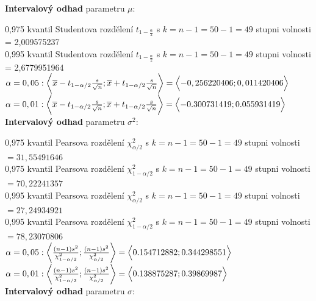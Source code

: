 \documentclass[11pt,a4paper]{article}
\begin{document}
\textbf{Intervalový odhad} parametru \textbf{$\mu:$}

0,975 kvantil Studentova rozdělení $ t_{1-\frac{\alpha}{2}} $ s $ k = n - 1 = 50 - 1 = 49 $ stupni volnosti = 2,009575237 \\

0,995 kvantil Studentova rozdělení $ t_{1-\frac{\alpha}{2}} $ s $ k = n - 1 = 50 - 1 = 49 $ stupni volnosti = 2,6779951964 \\

$ \alpha = 0,05 : \biggl< \overline{x} - t_{1-\alpha/2} \frac{s}{\sqrt{n}} ; \overline{x} + t_{1-\alpha/2} \frac{s}{\sqrt{n}} \biggr> = \Bigl< -0,256220406; 0,011420406 \Bigr>$ \\

$ \alpha = 0,01 : \biggl< \overline{x} - t_{1-\alpha/2} \frac{s}{\sqrt{n}} ; \overline{x} + t_{1-\alpha/2} \frac{s}{\sqrt{n}} \biggr> = \Bigl< -0.300731419; 0.055931419 \Bigr>$ \\

\vspace{0,7cm}
\textbf{Intervalový odhad} parametru \textbf{$\sigma^2:$}

0,975 kvantil Pearsova rozdělení $ \chi_{\alpha/2}^2 $ s $ k = n - 1 = 50 - 1 = 49 $ stupni volnosti $ = 31,55491646 $ \\

0,975 kvantil Pearsova rozdělení $ \chi_{1-\alpha/2}^2 $ s $ k = n - 1 = 50 - 1 = 49 $ stupni volnosti $ = 70,22241357 $ \\

0,995 kvantil Pearsova rozdělení $ \chi_{\alpha/2}^2 $ s $ k = n - 1 = 50 - 1 = 49 $ stupni volnosti $ = 27,24934921 $ \\

0,995 kvantil Pearsova rozdělení $ \chi_{1-\alpha/2}^2 $ s $ k = n - 1 = 50 - 1 = 49 $ stupni volnosti $ = 78,23070806 $ \\

$ \alpha = 0,05 : \biggl< \frac{(n - 1) s^2}{\chi_{1-\alpha/2}^2} ; \frac{(n - 1) s^2}{\chi_{\alpha/2}^2} \biggr> = \Bigl< 0.154712882 ; 0.344298551 \Bigr> $ \\

$ \alpha = 0,01 : \biggl< \frac{(n - 1) s^2}{\chi_{1-\alpha/2}^2} ; \frac{(n - 1) s^2}{\chi_{\alpha/2}^2} \biggr> = \Bigl< 0.138875287 ; 0.39869987 \Bigr> $ \\

\vspace{0,7cm}
\textbf{Intervalový odhad} parametru \textbf{$\sigma:$}
\end{document}

